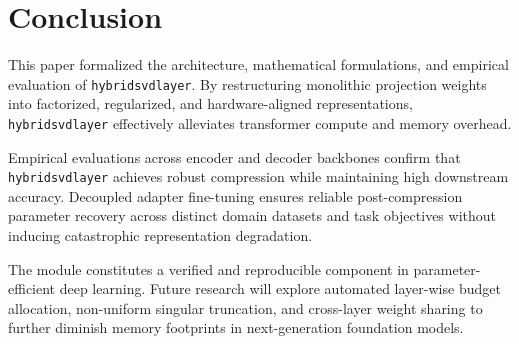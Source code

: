 \section{Conclusion}
This paper formalized the architecture, mathematical formulations, and empirical evaluation of \texttt{hybridsvdlayer}. By restructuring monolithic projection weights into factorized, regularized, and hardware-aligned representations, \texttt{hybridsvdlayer} effectively alleviates transformer compute and memory overhead.

Empirical evaluations across encoder and decoder backbones confirm that \texttt{hybridsvdlayer} achieves robust compression while maintaining high downstream accuracy. Decoupled adapter fine-tuning ensures reliable post-compression parameter recovery across distinct domain datasets and task objectives without inducing catastrophic representation degradation.

The module constitutes a verified and reproducible component in parameter-efficient deep learning. Future research will explore automated layer-wise budget allocation, non-uniform singular truncation, and cross-layer weight sharing to further diminish memory footprints in next-generation foundation models.

